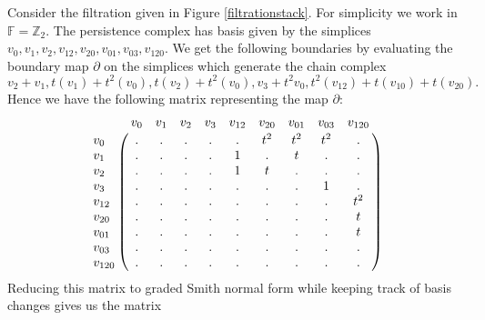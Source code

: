 \begin{example}\label{bddreduce}
Consider the filtration given in Figure \ref{filtrationstack}. For simplicity we work in $\mathbb{F}=\mathbb{Z}_{2}$. The persistence complex has basis given by the simplices $v_{0},v_{1},v_{2},v_{12},v_{20},v_{01},v_{03},v_{120}$. We get the following boundaries by evaluating the boundary map $\partial$ on the simplices which generate the chain complex \[v_{2}+v_{1},t(v_{1})+t^{2}(v_{0}),t(v_{2})+t^{2}(v_{0}),v_{3}+t^{2}v_{0}, t^{2}(v_{12})+t(v_{10})+t(v_{20}).\]
Hence we have the following matrix representing the map $\partial$:
\[
  \bordermatrix{
    & v_{0} & v_{1} & v_{2} & v_{3} & v_{12} & v_{20} & v_{01} & v_{03} & v_{120}\cr
    v_{0}  &.&.&.&.&.&t^{2}&t^{2}&t^{2}&.\cr
    v_{1}  &.&.&.&.&1&.&t&.&.\cr
    v_{2}  &.&.&.&.&1&t&.&.&.\cr
    v_{3}  &.&.&.&.&.&.&.&1&.\cr
    v_{12} &.&.&.&.&.&.&.&.&t^{2}\cr
    v_{20} &.&.&.&.&.&.&.&.&t\cr
    v_{01} &.&.&.&.&.&.&.&.&t\cr
    v_{03} &.&.&.&.&.&.&.&.&.\cr
    v_{120}&.&.&.&.&.&.&.&.&.
    }
  \]
  Reducing this matrix to graded Smith normal form while keeping track of basis changes gives us the matrix




\end{example}
